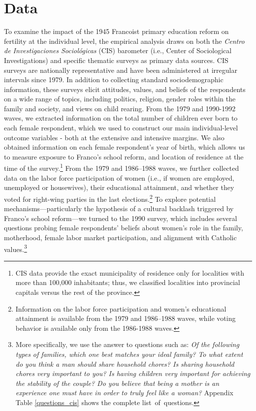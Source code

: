 \documentclass[a4paper,oneside,final,onecolumn,12pt,english]{article}
\begin{document}
\section{Data} \label{data}
To examine the impact of the 1945 Francoist primary education reform on fertility at the individual level, the empirical analysis draws on both the \textit{Centro de Investigaciones Sociol\'ogicas} (CIS) barometer (i.e., Center of Sociological Investigations) and specific thematic surveys as primary data sources. CIS surveys are nationally representative and have been administered at irregular intervals since 1979. In addition to collecting standard sociodemographic information, these surveys elicit attitudes, values, and beliefs of the respondents on a wide range of topics, including politics, religion, gender roles within the family and society, and views on child rearing. From the 1979 and 1990-1992 waves, we extracted information on the total number of children ever born to each female respondent, which we used to construct our main individual-level outcome variables - both at the extensive and intensive margins. We also obtained information on each female respondent’s year of birth, which allows us to measure exposure to Franco’s school reform, and location of residence at the time of the survey.\footnote{CIS data provide the exact municipality of residence only for localities with more than 100,000 inhabitants; thus, we classified localities into provincial capitals versus the rest of the province.} From the 1979 and 1986–1988 waves, we further collected data on the labor force participation of women (i.e., if women are employed, unemployed or housewives), their educational attainment, and whether they voted for right-wing parties in the last elections.\footnote{Information on the labor force participation and women's educational attainment is available from the 1979 and 1986–1988 waves, while voting behavior is available only from the 1986-1988 waves.} To explore potential mechanisms—particularly the hypothesis of a cultural backlash triggered by Franco’s school reform—we turned to the 1990 survey, which includes several questions probing female respondents’ beliefs about women’s role in the family, motherhood, female labor market participation, and alignment with Catholic values.\footnote{More specifically, we use the answer  to questions such as:  \textit{Of the following types of families, which one best matches your ideal family? To what extent do you think a man should share household chores? Is sharing household chores very important to you? Is having children very important for achieving the stability of the couple? Do you believe that being a mother is an experience one must have in order to truly feel like a woman?} Appendix Table \ref{questions_cis} shows the complete list of questions.} 
\end{document}
